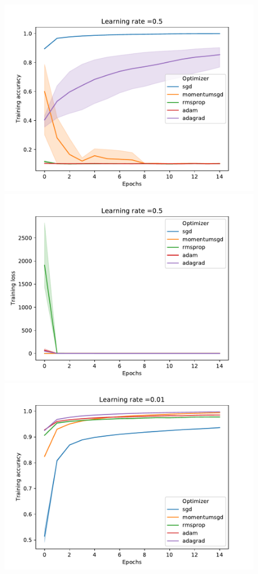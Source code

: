 \documentclass[letterpaper]{article}
\providecommand{\1}{\mathbf{1}}
\providecommand{\0}{\mathbf{0}}
\begin{document}
\begin{figure}
        \centering
        \begin{minipage}{.45\textwidth}
         \includegraphics[width=.9\textwidth]{acc_05}
        \end{minipage}
        \begin{minipage}{.45\textwidth}
         \includegraphics[width=.9\textwidth]{loss_05}
        \end{minipage}
        \begin{minipage}{.45\textwidth}
         \includegraphics[width=.9\textwidth]{acc_001}

\end{minipage}
\end{figure}
\end{document}
